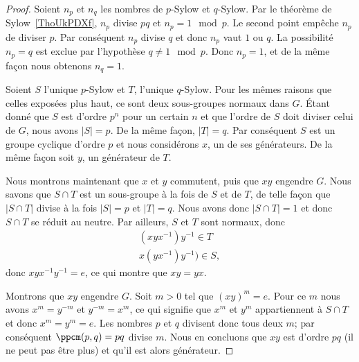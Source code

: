 \begin{proof}
    Soient \( n_p\) et \( n_q\) les nombres de \( p\)-Sylow et \( q\)-Sylow. Par le théorème de Sylow~\ref{ThoUkPDXf}, \( n_p\) divise \( pq\) et \( n_p=1\mod p\). Le second point empêche \( n_p\) de diviser \( p\). Par conséquent \( n_p\) divise \( q\) et donc \( n_p\) vaut \( 1\) ou \( q\). La possibilité \( n_p=q\) est exclue par l'hypothèse \( q\neq 1\mod p\). Donc \( n_p=1\), et de la même façon nous obtenons \( n_q=1\).

    Soient \( S\) l'unique \( p\)-Sylow et \( T\), l'unique \( q\)-Sylow. Pour les mêmes raisons que celles exposées plus haut, ce sont deux sous-groupes normaux dans \( G\). Étant donné que \( S\) est d'ordre \( p^n\) pour un certain \( n\) et que l'ordre de \( S\) doit diviser celui de \( G\), nous avons \( |S|=p\). De la même façon, \( | T |=q\). Par conséquent \( S\) est un groupe cyclique d'ordre \( p\) et nous considérons \( x\), un de ses générateurs. De la même façon soit \( y\), un générateur de \( T\).

    Nous montrons maintenant que \( x\) et \( y\) commutent, puis que \( xy\) engendre \( G\). Nous savons que \( S\cap T\) est un sous-groupe à la fois de \( S\) et de \( T\), de telle façon que \( | S\cap T |\) divise à la fois \( | S |=p\) et \( | T |=q\). Nous avons donc \( | S\cap T |=1\) et donc \( S\cap T\) se réduit au neutre. Par ailleurs, \( S\) et \( T\) sont normaux, donc
    \begin{subequations}
        \begin{align}
            (xyx^{-1})y^{-1}\in T\\
            x(yx^{-1})y^{-1})\in S,
        \end{align}
    \end{subequations}
    donc \( xyx^{-1}y^{-1}=e\), ce qui montre que \( xy=yx\).

    Montrons que \( xy\) engendre \( G\). Soit \( m>0\) tel que \( (xy)^m=e\). Pour ce \( m\) nous avons \( x^m=y^{-m}\) et \( y^{-m}=x^m\), ce qui signifie que \( x^m\) et \( y^m\) appartiennent à \( S\cap T\) et donc \( x^m=y^m=e\). Les nombres \( p\) et \( q\) divisent donc tous deux \( m\); par conséquent \( \ppcm(p,q)=pq\) divise \( m\). Nous en concluons que \( xy\) est d'ordre \( pq\) (il ne peut pas être plus) et qu'il est alors générateur.


\end{proof}
